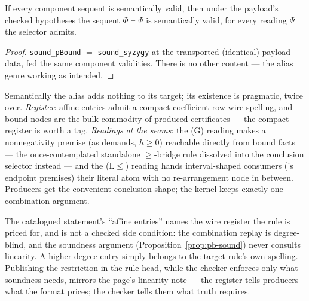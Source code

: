 \begin{bprop}\label{prop:pb-sound}
If every component sequent is semantically valid, then under the
payload's checked hypotheses the sequent $\Phi \vdash \Psi$ is
semantically valid, for every reading $\Psi$ the selector admits.
\end{bprop}
\begin{proof}
\texttt{sound\_pBound} $=$ \texttt{sound\_syzygy} at the transported
(identical) payload data, fed the same component validities. There is
no other content --- the alias genre working as intended.
\end{proof}

\begin{bremark}\label{rem:pb-why}
Semantically the alias adds nothing to its target; its existence is
pragmatic, twice over. \emph{Register}: affine entries admit a compact
coefficient-row wire spelling, and bound nodes are the bulk commodity
of produced certificates --- the compact register is worth a tag.
\emph{Readings at the seams}: the (G) reading makes a nonnegativity
premise (as  demands, $h \geq 0$) reachable
directly from bound facts --- the once-contemplated standalone
$\geq$-bridge rule dissolved into the conclusion selector instead ---
and the (L$\leq$) reading hands interval-shaped consumers
('s endpoint premises) their literal atom with no
 re-arrangement node in between. Producers get the
convenient conclusion shape; the kernel keeps exactly one combination
argument.
\end{bremark}

\begin{bremark}
\label{rem:pb-affine}
The catalogued statement's ``affine entries'' names the wire register
the rule is priced for, and is not a checked side condition: the
combination replay is degree-blind, and the soundness argument
(Proposition~\ref{prop:pb-sound}) never consults linearity. A
higher-degree entry simply belongs to the target rule's own spelling.
Publishing the restriction in the rule head, while the checker enforces
only what soundness needs, mirrors the  page's
linearity note --- the register tells producers what the format prices;
the checker tells them what truth requires.
\end{bremark}

